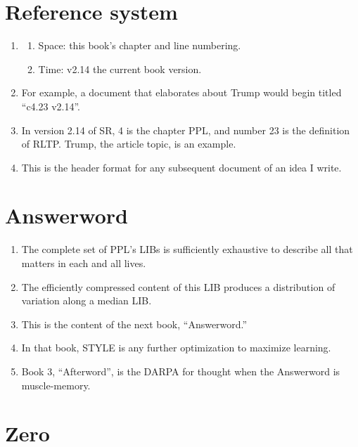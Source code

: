 \documentclass[
]{book}
\providecommand{\tightlist}{%
  \setlength{\itemsep}{0pt}\setlength{\parskip}{0pt}}
\begin{document}
\hypertarget{reference-system}{%
\section{Reference system}\label{reference-system}}

\begin{enumerate}
\def\labelenumi{\arabic{enumi}.}
\setcounter{enumi}{55}
\item
  \begin{enumerate}
  \def\labelenumii{\arabic{enumii}.}
  \tightlist
  \item
    Space: this book's chapter and line numbering.
  \item
    Time: v2.14 the current book version.
  \end{enumerate}
\item
  For example, a document that elaborates about Trump would begin
  titled ``c4.23 v2.14''.
\item
  In version 2.14 of SR, 4 is the chapter PPL, and number 23 is the
  definition of RLTP. Trump, the article topic, is an example.
\item
  This is the header format for any subsequent document of an idea I
  write.
\end{enumerate}

\hypertarget{answerword}{%
\section{Answerword}\label{answerword}}

\begin{enumerate}
\def\labelenumi{\arabic{enumi}.}
\setcounter{enumi}{59}
\item
  The complete set of PPL's LIBs is sufficiently exhaustive to
  describe all that matters in each and all lives.
\item
  The efficiently compressed content of this LIB produces a
  distribution of variation along a median LIB.
\item
  This is the content of the next book, ``Answerword.''
\item
  In that book, STYLE is any further optimization to maximize
  learning.
\item
  Book 3, ``Afterword'', is the DARPA for thought when the Answerword is
  muscle-memory.
\end{enumerate}

\hypertarget{zero}{%
\section{Zero}\label{zero}}
\end{document}
